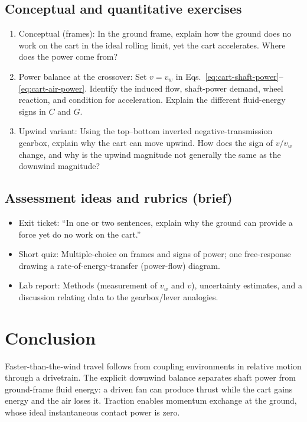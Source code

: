 \documentclass[reprint,aps,pra,longbibliography]{revtex4-2}
\begin{document}
\subsection{Conceptual and quantitative exercises}

\begin{enumerate}
\item Conceptual (frames): In the ground frame, explain how the ground does no work on the cart in the ideal rolling limit, yet the cart accelerates. Where does the power come from?

\item Power balance at the crossover: Set \(v=v_w\) in Eqs.~\eqref{eq:cart-shaft-power}--\eqref{eq:cart-air-power}. Identify the induced flow, shaft-power demand, wheel reaction, and condition for acceleration. Explain the different fluid-energy signs in \(C\) and \(G\).

\item Upwind variant: Using the top--bottom inverted negative-transmission gearbox, explain why the cart can move upwind. How does the sign of $v/v_w$ change, and why is the upwind magnitude not generally the same as the downwind magnitude?
\end{enumerate}

\subsection{Assessment ideas and rubrics (brief)}

\begin{itemize}
\item Exit ticket: ``In one or two sentences, explain why the ground can provide a force yet do no work on the cart.''
\item Short quiz: Multiple-choice on frames and signs of power; one free-response drawing a rate-of-energy-transfer (power-flow) diagram.
\item Lab report: Methods (measurement of $v_w$ and $v$), uncertainty estimates, and a discussion relating data to the gearbox/lever analogies.
\end{itemize}


\section{Conclusion}


Faster-than-the-wind travel follows from coupling environments in relative motion through a drivetrain. The explicit downwind balance separates shaft power from ground-frame fluid energy: a driven fan can produce thrust while the cart gains energy and the air loses it. Traction enables momentum exchange at the ground, whose ideal instantaneous contact power is zero.
\end{document}
